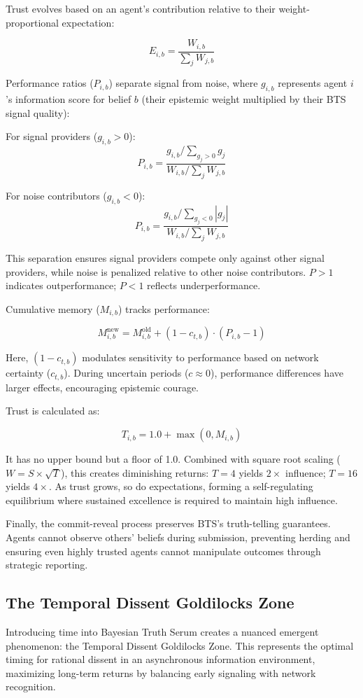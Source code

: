 \documentclass[11pt,a4paper]{article}
\begin{document}
Trust evolves based on an agent's contribution relative to their weight-proportional expectation:

$$E_{i,b} = \frac{W_{i,b}}{\sum_j W_{j,b}}$$

Performance ratios ($P_{i,b}$) separate signal from noise, where $g_{i,b}$ represents agent $i$'s information score for belief $b$ (their epistemic weight multiplied by their BTS signal quality):

For signal providers ($g_{i,b} > 0$):
$$P_{i,b} = \frac{g_{i,b}/\sum_{g_j > 0} g_j}{W_{i,b}/\sum_j W_{j,b}}$$

For noise contributors ($g_{i,b} < 0$):
$$P_{i,b} = \frac{g_{i,b}/\sum_{g_j < 0} |g_j|}{W_{i,b}/\sum_j W_{j,b}}$$

This separation ensures signal providers compete only against other signal providers, while noise is penalized relative to other noise contributors. $P > 1$ indicates outperformance; $P < 1$ reflects underperformance.

Cumulative memory ($M_{i,b}$) tracks performance:

$$M_{i,b}^{\text{new}} = M_{i,b}^{\text{old}} + (1 - c_{t,b}) \cdot (P_{i,b} - 1)$$

Here, $(1 - c_{t,b})$ modulates sensitivity to performance based on network certainty ($c_{t,b}$). During uncertain periods ($c \approx 0$), performance differences have larger effects, encouraging epistemic courage.

Trust is calculated as:

$$T_{i,b} = 1.0 + \max(0, M_{i,b})$$

It has no upper bound but a floor of 1.0. Combined with square root scaling ($W = S \times \sqrt{T}$), this creates diminishing returns: $T = 4$ yields $2\times$ influence; $T = 16$ yields $4\times$. As trust grows, so do expectations, forming a self-regulating equilibrium where sustained excellence is required to maintain high influence.

Finally, the commit-reveal process preserves BTS's truth-telling guarantees. Agents cannot observe others' beliefs during submission, preventing herding and ensuring even highly trusted agents cannot manipulate outcomes through strategic reporting.

\subsection{The Temporal Dissent Goldilocks Zone}

Introducing time into Bayesian Truth Serum creates a nuanced emergent phenomenon: the Temporal Dissent Goldilocks Zone. This represents the optimal timing for rational dissent in an asynchronous information environment, maximizing long-term returns by balancing early signaling with network recognition.
\end{document}
